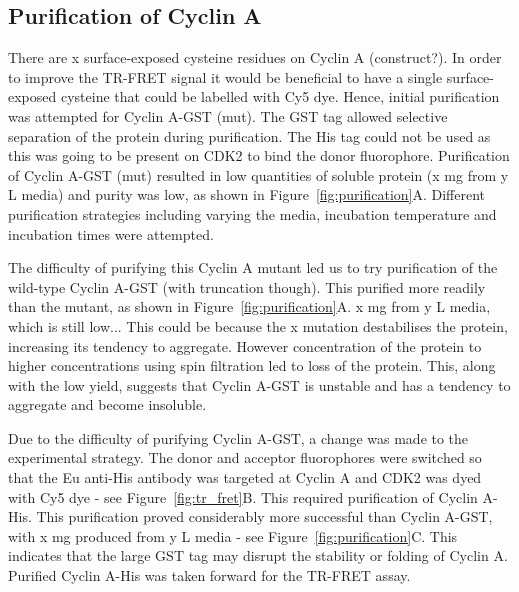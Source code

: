 \subsection{Purification of Cyclin A}

There are x surface-exposed cysteine residues on Cyclin A (construct?).
In order to improve the TR-FRET signal it would be beneficial to have a single surface-exposed cysteine that could be labelled with Cy5 dye.
Hence, initial purification was attempted for Cyclin A-GST (mut).
The GST tag allowed selective separation of the protein during purification.
The His tag could not be used as this was going to be present on CDK2 to bind the donor fluorophore.
Purification of Cyclin A-GST (mut) resulted in low quantities of soluble protein (x mg from y L media) and purity was low, as shown in Figure~\ref{fig:purification}A.
Different purification strategies including varying the media, incubation temperature and incubation times were attempted.

The difficulty of purifying this Cyclin A mutant led us to try purification of the wild-type Cyclin A-GST (with truncation though).
This purified more readily than the mutant, as shown in Figure~\ref{fig:purification}A.
x mg from y L media, which is still low...
This could be because the x mutation destabilises the protein, increasing its tendency to aggregate.
However concentration of the protein to higher concentrations using spin filtration led to loss of the protein.
This, along with the low yield, suggests that Cyclin A-GST is unstable and has a tendency to aggregate and become insoluble.

Due to the difficulty of purifying Cyclin A-GST, a change was made to the experimental strategy.
The donor and acceptor fluorophores were switched so that the Eu anti-His antibody was targeted at Cyclin A and CDK2 was dyed with Cy5 dye - see Figure~\ref{fig:tr_fret}B.
This required purification of Cyclin A-His.
This purification proved considerably more successful than Cyclin A-GST, with x mg produced from y L media - see Figure~\ref{fig:purification}C.
This indicates that the large GST tag may disrupt the stability or folding of Cyclin A.
Purified Cyclin A-His was taken forward for the TR-FRET assay.

